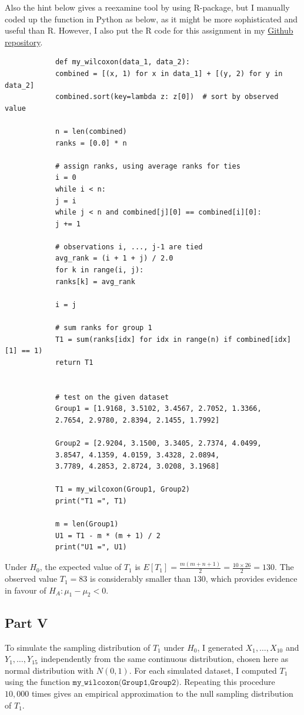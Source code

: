 \documentclass[letterpaper]{article}
\begin{document}
		Also the hint below gives a reexamine tool by using R-package, but I manually coded up the function in Python as below, as it might be more sophisticated and useful than R. However, I also put the R code for this assignment in my \href{https://github.com/zongyiliu/STAT_5291/tree/main/Homework/Homework_2}{Github repository}.
		\begin{lstlisting}
			def my_wilcoxon(data_1, data_2):
			combined = [(x, 1) for x in data_1] + [(y, 2) for y in data_2]
			combined.sort(key=lambda z: z[0])  # sort by observed value
			
			n = len(combined)
			ranks = [0.0] * n
			
			# assign ranks, using average ranks for ties
			i = 0
			while i < n:
			j = i
			while j < n and combined[j][0] == combined[i][0]:
			j += 1
			
			# observations i, ..., j-1 are tied
			avg_rank = (i + 1 + j) / 2.0
			for k in range(i, j):
			ranks[k] = avg_rank
			
			i = j
			
			# sum ranks for group 1
			T1 = sum(ranks[idx] for idx in range(n) if combined[idx][1] == 1)
			return T1
			
			
			# test on the given dataset
			Group1 = [1.9168, 3.5102, 3.4567, 2.7052, 1.3366,
			2.7654, 2.9780, 2.8394, 2.1455, 1.7992]
			
			Group2 = [2.9204, 3.1500, 3.3405, 2.7374, 4.0499,
			3.8547, 4.1359, 4.0159, 3.4328, 2.0894,
			3.7789, 4.2853, 2.8724, 3.0208, 3.1968]
			
			T1 = my_wilcoxon(Group1, Group2)
			print("T1 =", T1)
			
			m = len(Group1)
			U1 = T1 - m * (m + 1) / 2
			print("U1 =", U1)
		\end{lstlisting}
		
		Under $H_0$, the expected value of $T_1$ is
		$E[T_1] = \frac{m(m+n+1)}{2} = \frac{10\times 26}{2} = 130.$ The observed value $T_1=83$ is considerably smaller than $130$, which provides evidence in favour of $H_A: \mu_1-\mu_2 < 0$.
		\clearpage
		
		\subsection{Part V}
		
		To simulate the sampling distribution of $T_1$ under $H_0$, I generated
		$X_1,\dots,X_{10}$ and $Y_1,\dots,Y_{15}$ independently from the same continuous
		distribution, chosen here as normal distribution with $N(0,1)$. For each simulated dataset, I computed
		$T_1$ using the function $\texttt{my\_wilcoxon(Group1,Group2)}$. Repeating this
		procedure $10{,}000$ times gives an empirical approximation to the null sampling
		distribution of $T_1$.
		
\end{document}
